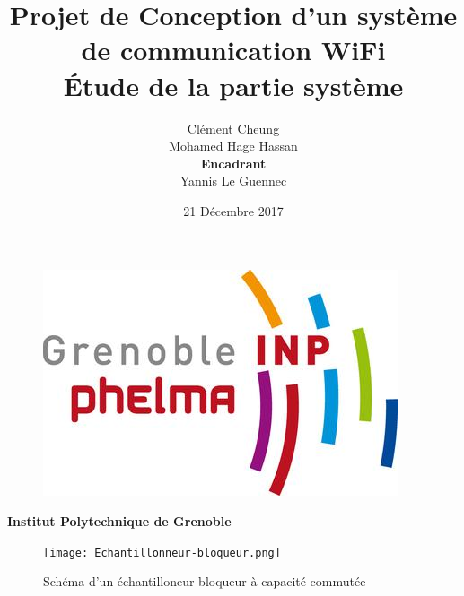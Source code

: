\documentclass[11pt]{article}
\begin{document}
\title{\textbf{Projet de Conception d'un syst\`eme\\ de communication WiFi} \\ \'Etude de la partie syst\`eme}
\author{Cl\'ement Cheung \\ Mohamed Hage Hassan \medskip\\\medskip \textbf{Encadrant} \medskip \\ Yannis Le Guennec}
\date{21 D\'ecembre 2017}
\maketitle
\thispagestyle{empty}

\renewcommand{\abstractname}{Pr\'eambule}

\begin{abstract}

\end{abstract}

\vskip 5cm

\begin{figure}[!htb]
\begin{center}
  \includegraphics[scale=1.2]{phelma-logo.jpg}
\end{center}
\end{figure}

\begin{center} \textbf{Institut Polytechnique de Grenoble} \end{center}

\clearpage

\tableofcontents
\clearpage

\iffalse

\begin{figure}[!htb]
\begin{center}
  \texttt{[image: Echantillonneur-bloqueur.png]}
  \caption{Sch\'ema d'un \'echantilloneur-bloqueur \`a capacit\'e commut\'ee}
\end{center}
\end{figure}
\end{document}
